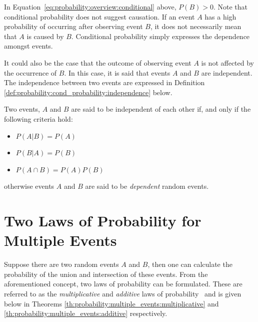 \noindent
In Equation~\eqref{eq:probability:overview:conditional} above, $P(B) > 0$. Note that conditional probability does not suggest causation. If an event $A$ has a high probability of occurring after observing event $B$, it does not necessarily mean that $A$ is caused by $B$. Conditional probability simply expresses the dependence amongst events.

It could also be the case that the outcome of observing event $A$ is not affected by the occurrence of $B$. In this case, it is said that events $A$ and $B$ are independent. The independence between two events are expressed in Definition \ref{def:probability:cond_probability:independence} below.

\begin{definition}
      \label{def:probability:cond_probability:independence}
      Two events, $A$ and $B$ are said to be independent of each other if, and only if the following criteria hold:

      \begin{itemize}
            \item $P(A \vert B) = P(A)$
            \item $P(B \vert A) = P(B)$
            \item $P(A \cap B) = P(A)P(B)$
      \end{itemize}

      \noindent
      otherwise events $A$ and $B$ are said to be \textit{dependent} random events.
\end{definition}

\section{Two Laws of Probability for Multiple Events}\label{sec:probability:multiple_events}

Suppose there are two random events $A$ and $B$, then one can calculate the probability of the union and intersection of these events. From the aforementioned concept, two laws of probability can be formulated. These are referred to as the \textit{multiplicative} and \textit{additive} laws of probability~\cite{ref:wackerly:2014} and is given below in Theorems \ref{th:probability:multiple_events:multiplicative} and \ref{th:probability:multiple_events:additive} respectively.

